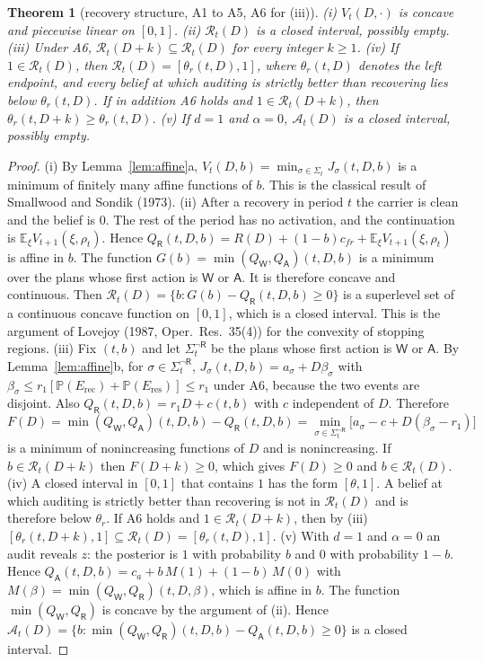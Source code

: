 \documentclass[11pt]{article}
\newtheorem{theorem}{Theorem}
\theoremstyle{definition}
\newcommand{\Rc}{\mathcal{R}}
\newcommand{\Ac}{\mathcal{A}}
\newcommand{\E}{\mathbb{E}}
\renewcommand{\P}{\mathbb{P}}
\newcommand{\Wa}{\mathsf{W}}
\newcommand{\Aa}{\mathsf{A}}
\newcommand{\Ra}{\mathsf{R}}
\begin{document}
\begin{theorem}[recovery structure, A1 to A5, A6 for (iii)]\label{thm:structure}
(i) $V_t(D,\cdot)$ is concave and piecewise linear on $[0,1]$.
(ii) $\Rc_t(D)$ is a closed interval, possibly empty.
(iii) Under A6, $\Rc_t(D+k)\subseteq\Rc_t(D)$ for every integer $k\ge1$.
(iv) If $1\in\Rc_t(D)$, then $\Rc_t(D)=[\theta_r(t,D),1]$, where $\theta_r(t,D)$ denotes the left endpoint,
and every belief at which auditing is strictly better than recovering lies below $\theta_r(t,D)$. If in
addition A6 holds and $1\in\Rc_t(D+k)$, then $\theta_r(t,D+k)\ge\theta_r(t,D)$.
(v) If $d=1$ and $\alpha=0$, $\Ac_t(D)$ is a closed interval, possibly empty.
\end{theorem}
\begin{proof}
(i) By Lemma~\ref{lem:affine}a, $V_t(D,b)=\min_{\sigma\in\Sigma_t}J_\sigma(t,D,b)$ is a minimum of finitely many
affine functions of $b$. This is the classical result of Smallwood and Sondik (1973).
(ii) After a recovery in period $t$ the carrier is clean and the belief is $0$. The rest of the period has
no activation, and the continuation is $\E_\xi V_{t+1}(\xi,\rho_t)$. Hence
$Q_\Ra(t,D,b)=R(D)+(1-b)c_{fr}+\E_\xi V_{t+1}(\xi,\rho_t)$ is affine in $b$. The function
$G(b)=\min(Q_\Wa,Q_\Aa)(t,D,b)$ is a minimum over the plans whose first action is $\Wa$ or $\Aa$. It is therefore
concave and continuous. Then $\Rc_t(D)=\{b:G(b)-Q_\Ra(t,D,b)\ge0\}$ is a superlevel set of a continuous
concave function on $[0,1]$, which is a closed interval. This is the argument of Lovejoy (1987,
Oper.\ Res.\ 35(4)) for the convexity of stopping regions.
(iii) Fix $(t,b)$ and let $\Sigma^{\neg\Ra}_t$ be the plans whose first action is $\Wa$ or $\Aa$. By
Lemma~\ref{lem:affine}b, for $\sigma\in\Sigma^{\neg\Ra}_t$, $J_\sigma(t,D,b)=a_\sigma+D\beta_\sigma$ with
$\beta_\sigma\le r_1[\P(E_{\mathrm{rec}})+\P(E_{\mathrm{res}})]\le r_1$ under A6, because the two events
are disjoint. Also $Q_\Ra(t,D,b)=r_1D+c(t,b)$ with $c$ independent of $D$. Therefore
\[F(D)=\min(Q_\Wa,Q_\Aa)(t,D,b)-Q_\Ra(t,D,b)=\min_{\sigma\in\Sigma^{\neg\Ra}_t}\big[a_\sigma-c+D(\beta_\sigma-r_1)\big]\]
is a minimum of nonincreasing functions of $D$ and is nonincreasing. If $b\in\Rc_t(D+k)$ then $F(D+k)\ge0$, which gives $F(D)\ge0$
and $b\in\Rc_t(D)$.
(iv) A closed interval in $[0,1]$ that contains $1$ has the form $[\theta,1]$. A belief at which auditing
is strictly better than recovering is not in $\Rc_t(D)$ and is therefore below $\theta_r$. If A6 holds
and $1\in\Rc_t(D+k)$, then by (iii) $[\theta_r(t,D+k),1]\subseteq\Rc_t(D)=[\theta_r(t,D),1]$.
(v) With $d=1$ and $\alpha=0$ an audit reveals $z$: the posterior is $1$ with probability $b$ and $0$ with
probability $1-b$. Hence $Q_\Aa(t,D,b)=c_a+b\,M(1)+(1-b)\,M(0)$ with $M(\beta)=\min(Q_\Wa,Q_\Ra)(t,D,\beta)$,
which is affine in $b$. The function $\min(Q_\Wa,Q_\Ra)$ is concave by the argument of (ii). Hence
$\Ac_t(D)=\{b:\min(Q_\Wa,Q_\Ra)(t,D,b)-Q_\Aa(t,D,b)\ge0\}$ is a closed interval.
\end{proof}
\end{document}
